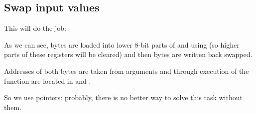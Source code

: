 \subsection{Swap input values}

This will do the job:



As we can see, bytes are loaded into lower 8-bit parts of  and  using 
(so higher parts of these registers will be cleared) and then bytes are written back swapped.



Addresses of both bytes are taken from arguments and through execution of the function are located
in  and .

So we use pointers: probably, there is no better way to solve this task without them.

